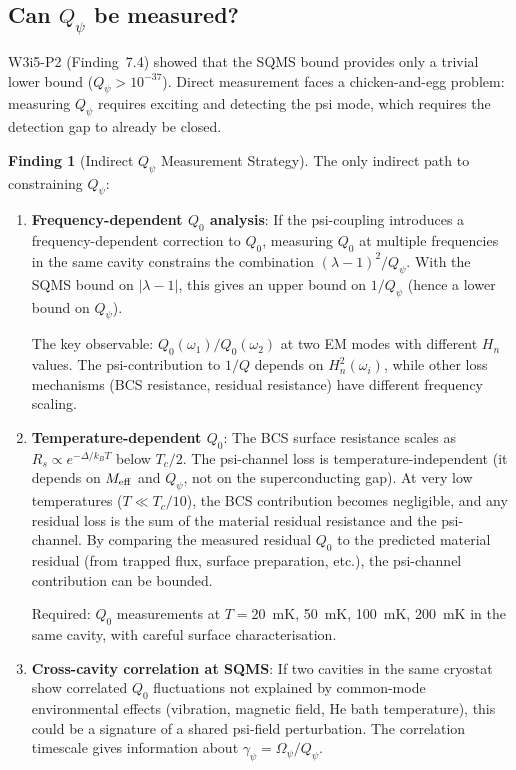 \documentclass[11pt]{article}
\newcommand{\lam}{\lambda}
\newcommand{\Opsi}{\Omega_\psi}
\newcommand{\gpsi}{\gamma_\psi}
\newcommand{\Meff}{M_{\rm eff}}
\newcommand{\Qpsi}{Q_\psi}
\newcommand{\Heff}{H_n}
\newcommand{\lbone}{|\lam - 1|}
\theoremstyle{definition}
\newtheorem{finding}[theorem]{Finding}
\theoremstyle{remark}
\begin{document}
\subsection{Can $\Qpsi$ be measured?}
\label{ssec:Qpsi_measurement}

W3i5-P2 (Finding~7.4) showed that the SQMS bound provides only a trivial
lower bound ($\Qpsi > 10^{-37}$). Direct measurement faces a chicken-and-egg
problem: measuring $\Qpsi$ requires exciting and detecting the psi mode,
which requires the detection gap to already be closed.

\begin{finding}[Indirect $\Qpsi$ Measurement Strategy]
\label{find:Qpsi_indirect}
The only indirect path to constraining $\Qpsi$:

\begin{enumerate}[nosep]
\item \textbf{Frequency-dependent $Q_0$ analysis}: If the psi-coupling
  introduces a frequency-dependent correction to $Q_0$, measuring $Q_0$
  at multiple frequencies in the same cavity constrains the combination
  $(\lam-1)^2/\Qpsi$. With the SQMS bound on $\lbone$, this gives
  an upper bound on $1/\Qpsi$ (hence a lower bound on $\Qpsi$).

  The key observable: $Q_0(\omega_1)/Q_0(\omega_2)$ at two EM modes with
  different $\Heff$ values. The psi-contribution to $1/Q$ depends on
  $\Heff^2(\omega_i)$, while other loss mechanisms (BCS resistance,
  residual resistance) have different frequency scaling.

\item \textbf{Temperature-dependent $Q_0$}: The BCS surface resistance
  scales as $R_s \propto e^{-\Delta/k_B T}$ below $T_c/2$. The psi-channel
  loss is temperature-independent (it depends on $\Meff$ and $\Qpsi$,
  not on the superconducting gap). At very low temperatures
  ($T \ll T_c/10$), the BCS contribution becomes negligible, and any
  residual loss is the sum of the material residual resistance and the
  psi-channel. By comparing the measured residual $Q_0$ to the predicted
  material residual (from trapped flux, surface preparation, etc.), the
  psi-channel contribution can be bounded.

  Required: $Q_0$ measurements at $T = 20$~mK, 50~mK, 100~mK, 200~mK
  in the same cavity, with careful surface characterisation.

\item \textbf{Cross-cavity correlation at SQMS}: If two cavities in the
  same cryostat show correlated $Q_0$ fluctuations not explained by
  common-mode environmental effects (vibration, magnetic field, He bath
  temperature), this could be a signature of a shared psi-field
  perturbation. The correlation timescale gives information about
  $\gpsi = \Opsi/\Qpsi$.
\end{enumerate}


\end{finding}
\end{document}
